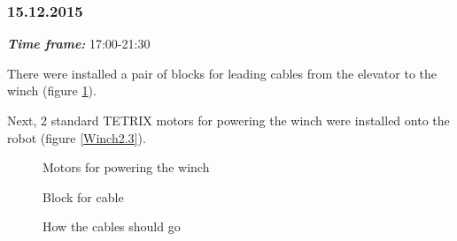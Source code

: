 \subsubsection{15.12.2015}
\textit{\textbf{Time frame:}} 17:00-21:30 

There were installed a pair of blocks for leading cables from the elevator to the winch (figure \ref{Winch2.4}).

Next, 2 standard TETRIX motors for powering the winch were installed onto the robot (figure \ref{Winch2.3}).

\begin{figure}[H]
	\begin{minipage}[h]{0.31\linewidth}
		\caption{Motors for powering the winch}
		\label{Winch2.3}
	\end{minipage}
	\hfill
	\begin{minipage}[h]{0.31\linewidth}
		\caption{Block for cable}
		\label{Winch2.4}
	\end{minipage}
	\hfill
	\begin{minipage}[h]{0.31\linewidth}
		\caption{How the cables should go}
	\end{minipage}
\end{figure}
